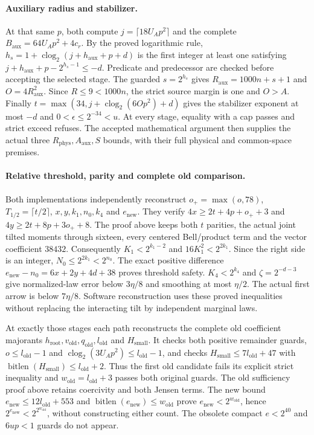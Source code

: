 \documentclass[11pt]{article}
\theoremstyle{plain}
\theoremstyle{definition}
\theoremstyle{remark}
\begin{document}
\paragraph{Auxiliary radius and stabilizer.}
At that same $p$, both compute $j=\lceil18U_Ap^2\rceil$ and the complete
$B_{\mathrm{aux}}=64U_Ap^2+4c_r$. By the proved logarithmic rule,
$h_s=1+\operatorname{clog}_2(j+h_{\mathrm{aux}}+p+d)$ is the first integer
at least one satisfying $j+h_{\mathrm{aux}}+p-2^{h_s-1}\le-d$.
Predicate and predecessor are checked before accepting the selected stage.
The guarded $s=2^{h_s}$ gives $R_{\mathrm{aux}}=1000n+s+1$ and
$O=4R_{\mathrm{aux}}^2$. Since $R\le9<1000n$, the strict source margin is
one and $O>A$. Finally
$t=\max(34,j+\operatorname{clog}_2(6Op^2)+d)$ gives the stabilizer exponent
at most $-d$ and $0<\epsilon\le2^{-34}<u$.
At every stage, equality with a cap passes and strict exceed refuses.
The accepted mathematical argument then supplies the actual three
$R_{\mathrm{phys}},A_{\mathrm{aux}},S$ bounds, with their full physical and
common-space premises.

\paragraph{Relative threshold, parity and complete old comparison.}
Both implementations independently reconstruct $o_+=\max(o,78)$,
$T_{1/2}=\lceil t/2\rceil$, $x,y,k_1,n_0,k_4$ and $e_{\mathrm{new}}$.
They verify $4x\ge2t+4p+o_++3$ and
$4y\ge2t+8p+3o_++8$. The proof above keeps both $t$ parities, the actual
joint tilted moments through sixteen, every centered Bell/product term and
the vector coefficient $38432$. Consequently $K_1<2^{k_1-2}$ and
$16K_1^2<2^{2k_1}$. Since the right side is an integer,
$N_0\le2^{2k_1}<2^{n_0}$. The exact positive difference
$e_{\mathrm{new}}-n_0=6x+2y+4d+38$ proves threshold safety.
$K_4<2^{k_4}$ and $\zeta=2^{-d-3}$ give normalized-law error below
$3\eta/8$ and smoothing at most $\eta/2$. The actual first arrow is below
$7\eta/8$. Software reconstruction uses these proved inequalities without
replacing the interacting tilt by independent marginal laws.

At exactly those stages each path reconstructs the complete old coefficient
majorants $h_{\mathrm{root}},v_{\mathrm{old}},q_{\mathrm{old}},l_{\mathrm{old}}$
and $H_{\mathrm{small}}$. It checks both positive remainder guards,
$o\le l_{\mathrm{old}}-1$ and
$\operatorname{clog}_2(3U_Ap^2)\le l_{\mathrm{old}}-1$, and checks
$H_{\mathrm{small}}\le7l_{\mathrm{old}}+47$ with
$\operatorname{bitlen}(H_{\mathrm{small}})\le l_{\mathrm{old}}+2$.
Thus the first old candidate fails its explicit strict inequality and
$w_{\mathrm{old}}=l_{\mathrm{old}}+3$ passes both original guards.
The old sufficiency proof above retains coercivity and both Jensen terms.
The new bound $e_{\mathrm{new}}\le12l_{\mathrm{old}}+553$ and
$\operatorname{bitlen}(e_{\mathrm{new}})\le w_{\mathrm{old}}$ prove
$e_{\mathrm{new}}<2^{w_{\mathrm{old}}}$, hence
$2^{e_{\mathrm{new}}}<2^{2^{w_{\mathrm{old}}}}$, without constructing either
count. The obsolete compact $e<2^{40}$ and $6up<1$ guards do not appear.
\end{document}
